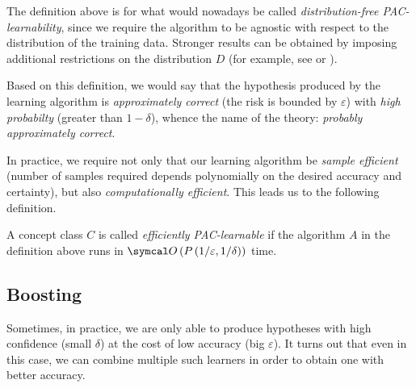 \begin{remark*}
The definition above is for what would nowadays be called \emph{distribution-free PAC-learnability}, since we require the algorithm to be agnostic with respect to the distribution of the training data. Stronger results can be obtained by imposing additional restrictions on the distribution \(D\) (for example, see \cite{Denis1997} or \cite{Cullina2018}).
\end{remark*}

Based on this definition, we would say that the hypothesis produced by the learning algorithm is \emph{approximately correct} (the risk is bounded by \(\varepsilon\)) with \emph{high probabilty} (greater than \(1 - \delta\)), whence the name of the theory: \emph{probably approximately correct}.

In practice, we require not only that our learning algorithm be \emph{sample efficient} (number of samples required depends polynomially on the desired accuracy and certainty), but also \emph{computationally efficient}. This leads us to the following definition.

\begin{definition}
A concept class \(C\) is called \emph{efficiently PAC-learnable} if the algorithm \(A\) in the definition above runs in \(\bigO\left(P\left(1/\varepsilon, 1/\delta\right)\right)\) time.
\end{definition}




\subsection{Boosting}

Sometimes, in practice, we are only able to produce hypotheses with high confidence (small \(\delta\)) at the cost of low accuracy (big \(\varepsilon\)). It turns out that even in this case, we can combine multiple such learners in order to obtain one with better accuracy.

